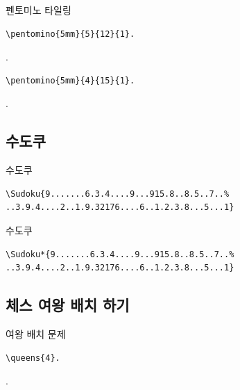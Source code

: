 \documentclass[xcolor=svgnames]{beamer}
\begin{document}
%
\begin{frame}[fragile]{펜토미노 타일링}
\begin{verbatim}
\pentomino{5mm}{5}{12}{1}.
\end{verbatim}
\vspace{-5mm}
.
\vspace{-5mm}
\begin{verbatim}
\pentomino{5mm}{4}{15}{1}.
\end{verbatim}
\vspace{-5mm}
.
\end{frame}


\subsection{수도쿠}

%
\begin{frame}[fragile]{수도쿠}
\begin{verbatim}
\Sudoku{9.......6.3.4....9...915.8..8.5..7..%
..3.9.4....2..1.9.32176....6..1.2.3.8...5...1}
\end{verbatim}  
\begin{center}
\end{center}
\end{frame}

%
\begin{frame}[fragile]{수도쿠}
\begin{verbatim}
\Sudoku*{9.......6.3.4....9...915.8..8.5..7..%
..3.9.4....2..1.9.32176....6..1.2.3.8...5...1}
\end{verbatim}
\begin{center}
\end{center}
\end{frame}


\subsection{체스 여왕 배치 하기}

%
\begin{frame}[fragile]{여왕 배치 문제}
\begin{verbatim}
\queens{4}.
\end{verbatim}
\vspace{-10mm}
.
\end{frame}
\end{document}
